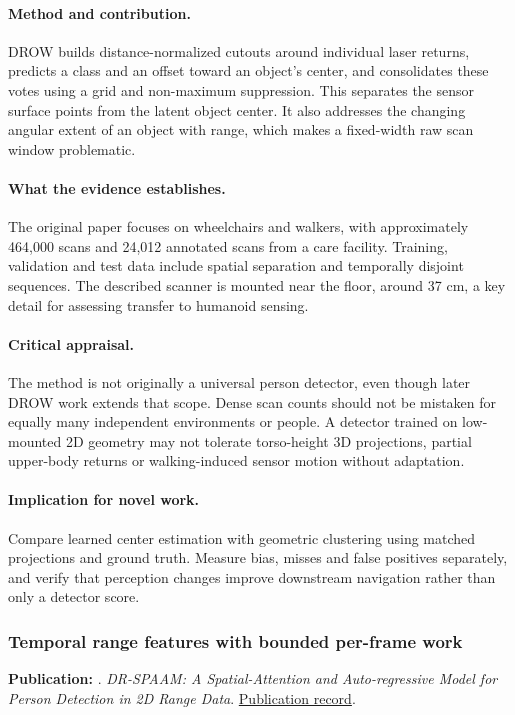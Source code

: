 \paragraph{Method and contribution.} DROW builds distance-normalized cutouts around individual laser returns, predicts a class and an offset toward an object's center, and consolidates these votes using a grid and non-maximum suppression. This separates the sensor surface points from the latent object center. It also addresses the changing angular extent of an object with range, which makes a fixed-width raw scan window problematic.

\paragraph{What the evidence establishes.} The original paper focuses on wheelchairs and walkers, with approximately 464,000 scans and 24,012 annotated scans from a care facility. Training, validation and test data include spatial separation and temporally disjoint sequences. The described scanner is mounted near the floor, around 37 cm, a key detail for assessing transfer to humanoid sensing.

\paragraph{Critical appraisal.} The method is not originally a universal person detector, even though later DROW work extends that scope. Dense scan counts should not be mistaken for equally many independent environments or people. A detector trained on low-mounted 2D geometry may not tolerate torso-height 3D projections, partial upper-body returns or walking-induced sensor motion without adaptation.

\paragraph{Implication for novel work.} Compare learned center estimation with geometric clustering using matched projections and ground truth. Measure bias, misses and false positives separately, and verify that perception changes improve downstream navigation rather than only a detector score.

\subsubsection{Temporal range features with bounded per-frame work}\label{paper:drspaam}
\textbf{Publication:} \citet{drspaam}. \emph{DR-SPAAM: A Spatial-Attention and Auto-regressive Model for Person Detection in 2D Range Data}. \href{https://doi.org/10.1109/iros45743.2020.9341689}{Publication record}.

